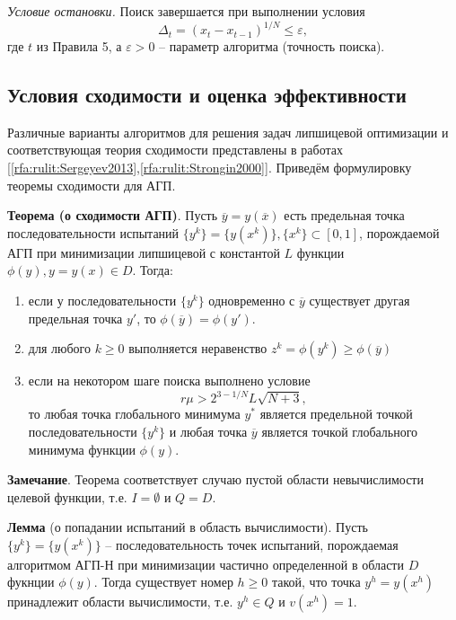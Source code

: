\documentclass[10pt,a4paper]{book}
\begin{document}
\textit{Условие остановки.} Поиск завершается при выполнении условия 
\[
\Delta _t = (x_t-x_{t-1})^{1/N} \leq \varepsilon,
\]
где $t$ из Правила 5, а $\varepsilon>0$ -- параметр алгоритма (точность поиска).

\subsection{Условия сходимости и оценка эффективности}

Различные варианты алгоритмов для решения задач липшицевой оптимизации и соответствующая теория сходимости представлены в работах [\ref{rfa:rulit:Sergeyev2013},\ref{rfa:rulit:Strongin2000}]. Приведём формулировку теоремы сходимости для АГП.

\textbf{Теорема (о сходимости АГП)}. Пусть $\overline{y}=y(\overline{x})$ есть предельная точка последовательности испытаний $\{y^k\}=\{y(x^k)\}, \{x^k\} \subset [0,1]$, порождаемой АГП при минимизации липшицевой с константой $L$ функции $\phi(y), y = y(x) \in D$. Тогда: 

\begin{enumerate}
\item
если у последовательности $\{y^k\}$ одновременно с $\overline{y}$ существует другая предельная точка $y'$, то  $\phi(\overline{y}) = \phi(y')$.
\item
для любого $k \geq 0$ выполняется неравенство $z^k = \phi(y^k) \geq \phi(\overline{y})$
\item
если на некотором шаге поиска выполнено условие 
\[
r\mu > 2^{3-1/N}L\sqrt{N+3},
\]
то любая точка глобального минимума $y^*$ является предельной точкой последовательности $\{y^k\}$ и любая точка $\overline{y}$ является точкой глобального минимума функции $\phi(y)$.
\end{enumerate}

\textbf{Замечание}. Теорема соответствует случаю пустой области невычислимости целевой функции, т.е. $I = \emptyset$ и $Q = D$.

\textbf{Лемма} (о попадании испытаний в область вычислимости). Пусть $\{y^k\}=\{y(x^k)\}$ -- последовательность точек испытаний, порождаемая алгоритмом АГП-Н при минимизации частично определенной в области $D$ фукнции $\phi(y)$. Тогда существует номер $h \geq 0$ такой, что точка $y^h = y(x^h)$ принадлежит области вычислимости, т.е. $y^h \in Q$ и $v(x^h) = 1$.
\end{document}
